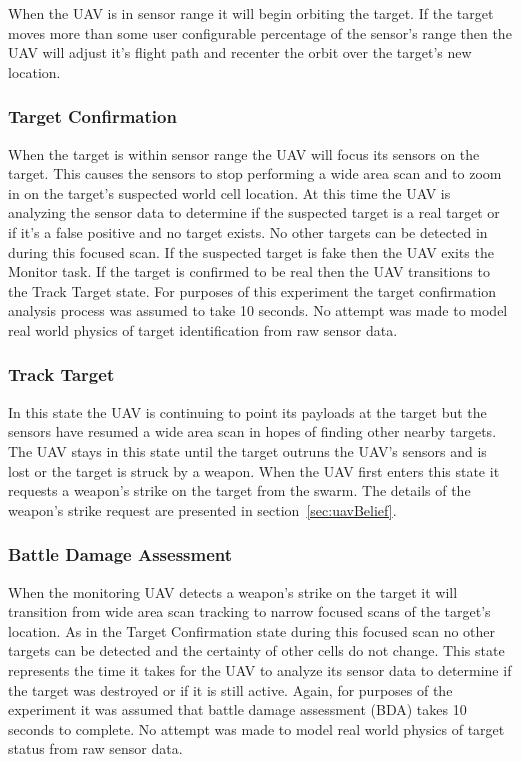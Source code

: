 When the UAV is in sensor range it will begin orbiting the target.  If the target moves more than some user configurable percentage of the sensor's range then the UAV will adjust it's flight path and recenter the orbit over the target's new location.

\subsubsection{Target Confirmation}
When the target is within sensor range the UAV will focus its sensors on the target.  This causes the sensors to stop performing a wide area scan and to zoom in on the target's suspected world cell location.  At this time the UAV is analyzing the sensor data to determine if the suspected target is a real target or if it's a false positive and no target exists.  No other targets can be detected in during this focused scan.  If the suspected target is fake then the UAV exits the Monitor task.  If the target is confirmed to be real then the UAV transitions to the Track Target state.  For purposes of this experiment the target confirmation analysis process was assumed to take 10 seconds.  No attempt was made to model real world physics of target identification from raw sensor data.

\subsubsection{Track Target}
In this state the UAV is continuing to point its payloads at the target but the sensors have resumed a wide area scan in hopes of finding other nearby targets.  The UAV stays in this state until the target outruns the UAV's sensors and is lost or the target is struck by a weapon.  When the UAV first enters this state it requests a weapon's strike on the target from the swarm.  The details of the weapon's strike request are presented in section~\ref{sec:uavBelief}.

\subsubsection{Battle Damage Assessment}
When the monitoring UAV detects a weapon's strike on the target it will transition from wide area scan tracking to narrow focused scans of the target's location.  As in the Target Confirmation state during this focused scan no other targets can be detected and the certainty of other cells do not change.  This state represents the time it takes for the UAV to analyze its sensor data to determine if the target was destroyed or if it is still active.  Again, for purposes of the experiment it was assumed that battle damage assessment (BDA) takes 10 seconds to complete.  No attempt was made to model real world physics of target status from raw sensor data.

